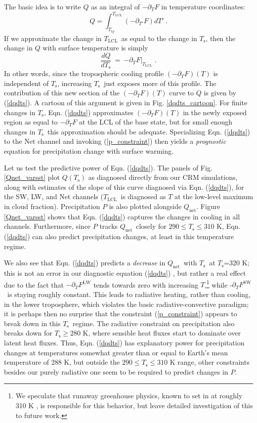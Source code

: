\documentclass[10pt]{article}
\newcommand{\beqn}{\begin{equation}}
\newcommand{\eeqn}{\end{equation}}
\newcommand{\eqnref}[1]{(\ref{#1})}
\newcommand{\n}{\nonumber}
\newcommand{\der}[2]{\ensuremath{\frac{d #1}{d #2}}}
\newcommand{\ppt}{\ensuremath{\partial_T}}
\newcommand{\Qnet}{\ensuremath{Q_\mathrm{net}}}
\newcommand{\FLW}{\ensuremath{F^\mathrm{LW}}}
\newcommand{\FSW}{\ensuremath{F^\mathrm{SW}}}
\newcommand{\Ts}{\ensuremath{T_\mathrm{s}}}
\newcommand{\Tlcl}{\ensuremath{T_\mathrm{LCL}}}
\newcommand{\Ttp}{\ensuremath{T_\mathrm{tp}}}
\begin{document}
	  The basic idea is to write $Q$ as an integral of $-\ppt F$  in temperature coordinates: 
	\beqn
		Q =  \int_{\Ttp}^{\Tlcl} (-\partial_{T'} F) dT' \ . 
		\n
	\eeqn
   If we approximate the change in  \Tlcl\ as equal to the change in \Ts, then the change in $Q$ with surface temperature is  simply
	\beqn
		\der{Q}{\Ts} \ =\  \left.  -\ppt F\right|_{\Tlcl}  \; .
	\label{dqdts}
	\eeqn
In other words, since the tropospheric cooling profile $(-\ppt F)(T)$  is independent of \Ts, increasing \Ts\ just exposes more of this profile.  The contribution of this new section of the $(-\ppt F)(T)$ curve to $Q$ is given by \eqnref{dqdts}.  A cartoon of this argument is given in Fig. \ref{dqdts_cartoon}. For finite changes in \Ts, Eqn. \eqnref{dqdts} approximates $(-\ppt F)(T)$ in the newly exposed region as equal to $-\ppt F$ at the LCL of the base state, but for small enough changes in \Ts\ this approximation should be adequate. Specializing Eqn. \eqnref{dqdts} to the Net channel and invoking \eqnref{p_constraint} then yields a \emph{prognostic} equation for precipitation change with surface warming.

Let us test the predictive power of Eqn. \eqnref{dqdts}. The panels of Fig. \ref{Qnet_varsst} plot $Q(\Ts)$ as diagnosed directly from our CRM simulations, along with estimates of the slope of this curve diagnosed via  Eqn. \eqnref{dqdts}, for the SW, LW, and Net  channels (\Tlcl\ is diagnosed as $T$ at the low-level maximum in cloud fraction). Precipitation $P$ is also plotted alongside $\Qnet$.  Figure \ref{Qnet_varsst} shows that  Eqn. \eqnref{dqdts}  captures the changes in  cooling in all channels. Furthermore, since $P$ tracks \Qnet\ closely for $290\leq \Ts \leq 310$ K, Eqn. \eqnref{dqdts} can also predict precipitation changes, at least in this temperature regime.

We also see that  Eqn. \eqnref{dqdts} predicts a \emph{decrease} in  \Qnet\ with \Ts\ at \Ts=320 K; this is not an error in our diagnostic equation \eqnref{dqdts} , but rather a real effect due to the fact that $-\ppt \FLW$ tends towards zero with increasing $T$,\footnote{We speculate that runaway greenhouse physics, known to set in at roughly 310 K \citep{goldblatt2013}, is responsible for this behavior, but leave detailed investigation of this to future work.} while -\ppt \FSW\ is staying roughly constant. This leads to radiative heating, rather than cooling, in the  lower troposphere, which violates the basic radiative-convective paradigm; it is perhaps then no surprise that the constraint \eqnref{p_constraint} appears to break down in this \Ts\ regime. The radiative constraint on precipitation also breaks down for $\Ts \geq 280$ K, where sensible heat fluxes start to dominate over latent heat fluxes. Thus, Eqn. \eqnref{dqdts} has explanatory power for  precipitation changes at  temperatures somewhat greater than or equal to Earth's mean temperature of 288 K, but outside the $290\leq \Ts \leq 310$ K range, other constraints besides our purely radiative one seem to be required to predict changes in $P$.
\end{document}
